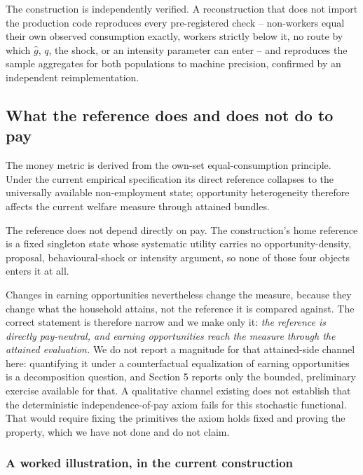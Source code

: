 \documentclass[11pt,a4paper]{article}
\begin{document}
The construction is independently verified. A reconstruction that does not import the production code reproduces every pre-registered check -- non-workers equal their own observed consumption exactly, workers strictly below it, no route by which \(\widehat g\), \(q\), the shock, or an intensity parameter can enter -- and reproduces the sample aggregates for both populations to machine precision, confirmed by an independent reimplementation.

\subsection{What the reference does and does not do to pay}\label{what-the-reference-does-and-does-not-do-to-pay}

The money metric is derived from the own-set equal-consumption principle. Under the current empirical specification its direct reference collapses to the universally available non-employment state; opportunity heterogeneity therefore affects the current welfare measure through attained bundles.

The reference does not depend directly on pay. The construction's home reference is a fixed singleton state whose systematic utility carries no opportunity-density, proposal, behavioural-shock or intensity argument, so none of those four objects enters it at all.

Changes in earning opportunities nevertheless change the measure, because they change what the household attains, not the reference it is compared against. The correct statement is therefore narrow and we make only it: \emph{the reference is directly pay-neutral, and earning opportunities reach the measure through the attained evaluation.} We do not report a magnitude for that attained-side channel here: quantifying it under a counterfactual equalization of earning opportunities is a decomposition question, and Section 5 reports only the bounded, preliminary exercise available for that. A qualitative channel existing does not establish that the deterministic independence-of-pay axiom fails for this stochastic functional. That would require fixing the primitives the axiom holds fixed and proving the property, which we have not done and do not claim.

\subsubsection{A worked illustration, in the current construction}\label{a-worked-illustration-in-the-current-construction}
\end{document}
